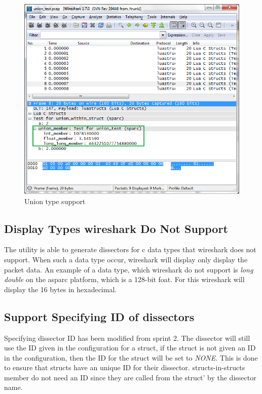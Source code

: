 \begin{figure}[ht]
	\center
	\includegraphics[width=\textwidth]{./sprints/img/wireshark_union}
	\caption{Union type support\label{fig:wsunion}}
\end{figure}



\subsection{Display Types \Gls{wireshark} Do Not Support}
The \gls{utility} is able to generate \glspl{dissector} for \Gls{c} data types that \Gls{wireshark} 
does not support. When such a data type occur, \Gls{wireshark} will display only 
display the \gls{packet} data. An example of a data type, which \Gls{wireshark} do not 
support is \emph{long double} on the \gls{asparc} platform, which is a 128-bit foat. 
For this \Gls{wireshark} will display the 16 bytes in \gls{hexadecimal}.

\subsection{Support Specifying ID of \Glspl{dissector}}
Specifying \gls{dissector} ID has been modified from sprint 2. The \gls{dissector} will 
still use the ID given in the configuration for a \gls{struct}, if the \gls{struct} is not 
given an ID in the configuration, then the ID for the \gls{struct} will be set to 
\emph{NONE}. This is done to ensure that \glspl{struct} have an unique ID for their 
\gls{dissector}. \Glspl{struct}-in-\glspl{struct} \gls{member} do not need an ID since they are called 
from the \gls{struct}' by the \gls{dissector} name.

